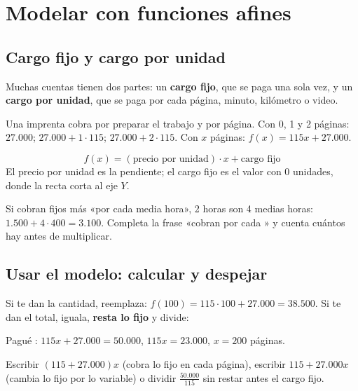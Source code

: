 \section{Modelar con funciones afines}

\subsection{Cargo fijo y cargo por unidad}
Muchas cuentas tienen dos partes: un \textbf{cargo fijo}, que se paga una sola vez, y un \textbf{cargo por unidad}, que se paga por cada página, minuto, kilómetro o video.
\begin{ejemplo} Una imprenta cobra  por preparar el trabajo y  por página. Con 0, 1 y 2 páginas: $27.000$; $27.000 + 1\cdot 115$; $27.000 + 2\cdot 115$. Con $x$ páginas: $f(x) = 115x + 27.000$.\end{ejemplo}
\begin{clave} $$f(x) = (\text{precio por unidad})\cdot x + \text{cargo fijo}$$ El precio por unidad es la pendiente; el cargo fijo es el valor con 0 unidades, donde la recta corta al eje $Y$.\end{clave}
\begin{ojo} Si cobran  fijos más  «por cada media hora», 2 horas son 4 medias horas: $1.500 + 4\cdot 400 = 3.100$. Completa la frase «cobran por cada \underline{\hspace{1cm}}» y cuenta cuántos hay antes de multiplicar.\end{ojo}

\subsection{Usar el modelo: calcular y despejar}
Si te dan la cantidad, reemplaza: $f(100) = 115\cdot 100 + 27.000 = 38.500$. Si te dan el total, iguala, \textbf{resta lo fijo} y divide:
\begin{ejemplo} Pagué : $115x + 27.000 = 50.000$, $115x = 23.000$, $x = 200$ páginas.\end{ejemplo}
\begin{ojo} Escribir $(115 + 27.000)x$ (cobra lo fijo en cada página), escribir $115 + 27.000x$ (cambia lo fijo por lo variable) o dividir $\frac{50.000}{115}$ sin restar antes el cargo fijo.\end{ojo}

